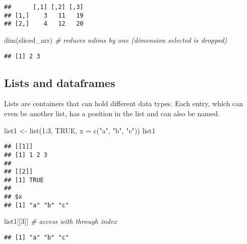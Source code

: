 \documentclass[
  oneside]{book}
\newenvironment{Shaded}{\begin{snugshade}}{\end{snugshade}}
\newcommand{\AttributeTok}[1]{\textcolor[rgb]{0.77,0.63,0.00}{#1}}
\newcommand{\CommentTok}[1]{\textcolor[rgb]{0.56,0.35,0.01}{\textit{#1}}}
\newcommand{\ConstantTok}[1]{\textcolor[rgb]{0.00,0.00,0.00}{#1}}
\newcommand{\DecValTok}[1]{\textcolor[rgb]{0.00,0.00,0.81}{#1}}
\newcommand{\FunctionTok}[1]{\textcolor[rgb]{0.00,0.00,0.00}{#1}}
\newcommand{\NormalTok}[1]{#1}
\newcommand{\OtherTok}[1]{\textcolor[rgb]{0.56,0.35,0.01}{#1}}
\newcommand{\SpecialCharTok}[1]{\textcolor[rgb]{0.00,0.00,0.00}{#1}}
\newcommand{\StringTok}[1]{\textcolor[rgb]{0.31,0.60,0.02}{#1}}
\begin{document}
\begin{verbatim}
##      [,1] [,2] [,3]
## [1,]    3   11   19
## [2,]    4   12   20
\end{verbatim}

\begin{Shaded}
\begin{Highlighting}[]
\FunctionTok{dim}\NormalTok{(sliced\_arr) }\CommentTok{\# reduces ndims by one (dimension selected is dropped)}
\end{Highlighting}
\end{Shaded}

\begin{verbatim}
## [1] 2 3
\end{verbatim}

\hypertarget{lists-and-dataframes}{%
\subsection{Lists and dataframes}\label{lists-and-dataframes}}

Lists are containers that can hold different data types. Each entry,
which can even be another list, has a position in the list and can also
be named.

\begin{Shaded}
\begin{Highlighting}[]
\NormalTok{list1  }\OtherTok{\textless{}{-}} \FunctionTok{list}\NormalTok{(}\DecValTok{1}\SpecialCharTok{:}\DecValTok{3}\NormalTok{, }\ConstantTok{TRUE}\NormalTok{, }\AttributeTok{x =} \FunctionTok{c}\NormalTok{(}\StringTok{"a"}\NormalTok{, }\StringTok{"b"}\NormalTok{, }\StringTok{"c"}\NormalTok{))}
\NormalTok{list1}
\end{Highlighting}
\end{Shaded}

\begin{verbatim}
## [[1]]
## [1] 1 2 3
## 
## [[2]]
## [1] TRUE
## 
## $x
## [1] "a" "b" "c"
\end{verbatim}

\begin{Shaded}
\begin{Highlighting}[]
\NormalTok{list1[[}\DecValTok{3}\NormalTok{]] }\CommentTok{\# access with through index}
\end{Highlighting}
\end{Shaded}

\begin{verbatim}
## [1] "a" "b" "c"
\end{verbatim}
\end{document}
